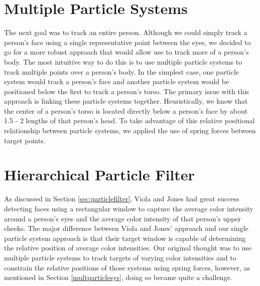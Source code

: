 \documentclass[11pt]{article}
\begin{document}
\section{Multiple Particle Systems}
\label{sec:multparticlesys}

The next goal was to track an entire person. Although we could simply track a person's face using a single representative point between the eyes, we decided to go for a more robust approach that would allow use to track more of a person's body. The most intuitive way to do this is to use multiple particle systems to track multiple points over a person's body. In the simplest case, one particle system would track a person's face and another particle system would be positioned below the first to track a person's torso. The primary issue with this approach is linking these particle systems together. Heuristically, we know that the center of a person's torso is located directly below a person's face by about 1.5 - 2 lengths of that person's head. To take advantage of this relative positional relationship between particle systems, we applied the use of spring forces between target points.




\section{Hierarchical Particle Filter}
\label{sec:hybridfilter}

As discussed in Section \ref{sec:particlefilter}, Viola and Jones had great success detecting faces using a rectangular window to capture the average color intensity around a person's eyes and the average color intensity of that person's upper cheeks. The major difference between Viola and Jones' approach and our single particle system approach is that their target window is capable of determining the relative position of average color intensities. Our original thought was to use multiple particle systems to track targets of varying color intensities and to constrain the relative positions of those systems using spring forces, however, as mentioned in Section \ref{multparticlesys}, doing so became quite a challenge. 
\end{document}
